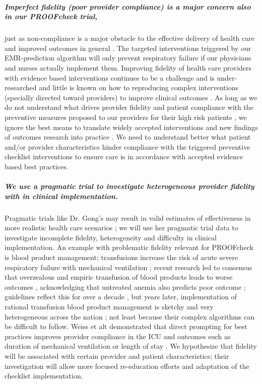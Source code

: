 \documentclass[11pt,notitlepage]{article}
\begin{document}
\subparagraph*{Imperfect fidelity (poor provider compliance) is a major concern also in our PROOFcheck trial,} just as non-compliance is a major obstacle to the effective delivery of health care and improved outcomes in general
\cite{Duncan_16710766}. The targeted interventions triggered by our EMR-prediction algorithm will only prevent respiratory failure if our physicians and nurses actually implement them. Improving fidelity of health care providers with evidence based interventions continues to be a challenge and is under-researched \cite{Davis_7650822} and little is known on how to reproducing complex interventions (specially directed toward providers) to improve clinical outcomes \cite{Campbell_10987780}. As long as we do not understand what drives provider fidelity and patient compliance with the preventive measures proposed to our providers for their high risk patients  \cite{Mittman_15172904}, we ignore the best means to translate widely accepted interventions and new findings of outcomes research into practice \cite{Glasgow_17150029}. We need to understand better what patient and/or provider characteristics hinder compliance with the triggered preventive checklist interventions to ensure care is in accordance with accepted evidence based best practices.

\subparagraph*{We use a pragmatic trial to investigate heterogeneous provider fidelity with in clinical implementation.} Pragmatic trials like Dr. Gong's may result in valid estimates of effectiveness in more realistic health care scenarios \cite{Selby_22824225,Tosh_21842618}; we will use her pragmatic trial data to investigate incomplete fidelity, heterogeneity and difficulty in clinical implementation. An example with problematic fidelity relevant for PROOFcheck is blood product management; transfusions increase the risk of acute severe respiratory failure with mechanical ventilation \cite{Kenz_24892308};  recent research led to consensus that overzealous and empiric transfusion of blood products leads to worse outcomes \cite{Hebert_9971864}, acknowledging that untreated anemia also predicts poor outcome \cite{Ranucci_22698773}; guidelines reflect this for over a decade \cite{ASA_25545654}, but  years later, implementation of rational transfusion blood product management is sketchy and very heterogeneous across the nation \cite{Likosky_20488928}; not least because their complex algorithms can be difficult to follow. Weiss et alt demonstrated that direct prompting for best practices improves provider compliance in the ICU and outcomes such as duration of mechanical ventilation or length of stay \cite{Weiss_21616996}. We hypothesize that fidelity will be associated with certain provider and patient characteristics; their investigation will allow more focused re-education efforts and adaptation of the checklist implementation. 
\end{document}
